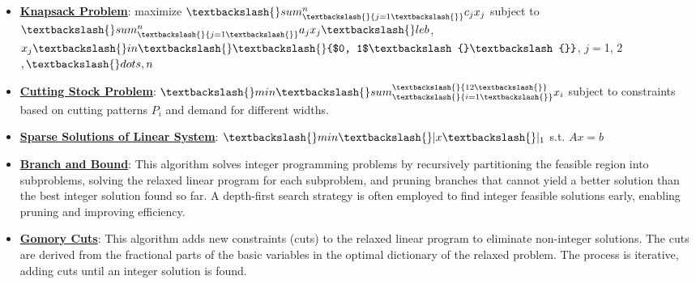 \documentclass{article}%
\begin{document}
\begin{itemize}[leftmargin=*]
\item \href{https://www.math.purdue.edu/~yipn/421/2024-10-28-ApplsLinProg.pdf#page=24}{\textbf{Knapsack Problem}}: maximize $\textbackslash{}sum_\textbackslash{}{j=1\textbackslash{}}^n c_j x_j$ subject to $\textbackslash{}sum_\textbackslash{}{j=1\textbackslash{}}^n a_j x_j \textbackslash{}le b$, $x_j \textbackslash{}in \textbackslash{}\textbackslash{}{$0, 1$\textbackslash{}\textbackslash{}}$, $j = $1, 2$, \textbackslash{}dots, n$%
\item \href{https://www.math.purdue.edu/~yipn/421/2024-10-28-ApplsLinProg.pdf#page=29}{\textbf{Cutting Stock Problem}}: $\textbackslash{}min \textbackslash{}sum_\textbackslash{}{i=1\textbackslash{}}^\textbackslash{}{12\textbackslash{}} x_i$ subject to  constraints based on cutting patterns $P_i$ and demand for different widths.%
\item \href{https://www.math.purdue.edu/~yipn/421/2024-10-28-ApplsLinProg.pdf#page=34}{\textbf{Sparse Solutions of Linear System}}: $\textbackslash{}min \textbackslash{}|x\textbackslash{}|_1$ s.t. $Ax = b$%
\end{itemize}%
\begin{itemize}[leftmargin=*]%
\item \href{https://www.math.purdue.edu/~yipn/421/2024-10-31-IntLinProg.pdf#page=5}{\textbf{Branch and Bound}}: This algorithm solves integer programming problems by recursively partitioning the feasible region into subproblems, solving the relaxed linear program for each subproblem, and pruning branches that cannot yield a better solution than the best integer solution found so far. A depth-first search strategy is often employed to find integer feasible solutions early, enabling pruning and improving efficiency.%
\item \href{https://www.math.purdue.edu/~yipn/421/2024-10-31-IntLinProg.pdf#page=15}{\textbf{Gomory Cuts}}: This algorithm adds new constraints (cuts) to the relaxed linear program to eliminate non-integer solutions. The cuts are derived from the fractional parts of the basic variables in the optimal dictionary of the relaxed problem. The process is iterative, adding cuts until an integer solution is found.%
\end{itemize}%
\end{document}
